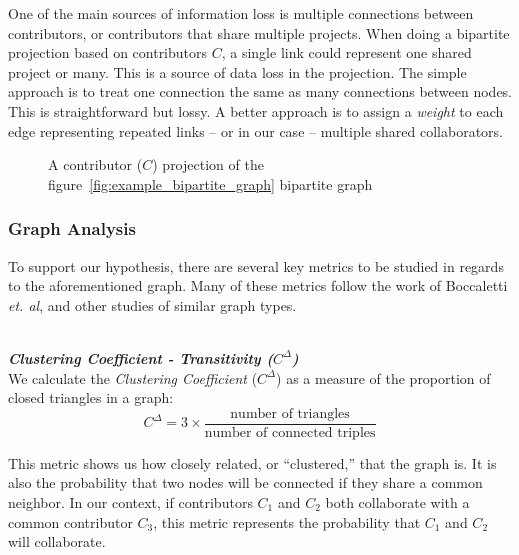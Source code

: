 \documentclass{proc}
\begin{document}
One of the main sources of information loss is multiple connections between contributors, or contributors that share multiple projects. When doing a bipartite projection based on contributors $C$, a single link could represent one shared project or many. This is a source of data loss in the projection. The simple approach is to treat one connection the same as many connections between nodes. This is straightforward but lossy\cite{zhou2007bipartite,grossman1995portion}. A better approach is to assign a \textit{weight} to each edge representing repeated links -- or in our case -- multiple shared collaborators\cite{zha2001bipartite,barrat2004architecture}. 

\begin{figure}
\centering
{}
\caption{A contributor ($C$) projection of the figure~\ref{fig:example_bipartite_graph} bipartite graph}
\label{fig:example_bipartite_projection_graph}
\end{figure}

\subsubsection{Graph Analysis}
To support our hypothesis, there are several key metrics to be studied in regards to the aforementioned graph. Many of these metrics follow the work of Boccaletti \textit{et. al}\cite{boccaletti2006complex}, and other studies of similar graph types\cite{latora2001efficient,adamic1999small}.

\noindent\\\textit{\textbf{Clustering Coefficient - Transitivity ($C^\Delta$)}}\\
We calculate the \textit{Clustering Coefficient} ($C^\Delta$) as a measure of the proportion of closed triangles in a graph\cite{newman2003structure}:
\[C^\Delta = 3 \times \frac{\text{number of triangles}}
                    {\text{number of connected triples}}\]

This metric shows us how closely related, or ``clustered,'' that the graph is. It is also the probability that two nodes will be connected if they share a common neighbor\cite{newman2003properties}. In our context, if contributors $C_1$ and $C_2$ both collaborate with a common contributor $C_3$, this metric represents the probability that $C_1$ and $C_2$ will collaborate.
\end{document}
